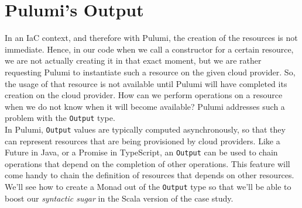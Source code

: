\section{Pulumi's Output}
In an IaC context, and therefore with Pulumi, the creation of the resources is not immediate.
Hence, in our code when we call a constructor for a certain resource, we are not actually creating it in that exact moment, but we are rather requesting Pulumi to instantiate such a resource on the given cloud provider.
So, the usage of that resource is not available until Pulumi will have completed its creation on the cloud provider.
How can we perform operations on a resource when we do not know when it will become available?
Pulumi addresses such a problem with the \texttt{Output} type.\\
In Pulumi, \texttt{Output} values are typically computed asynchronously, so that they can represent resources that are being provisioned by cloud providers.
Like a Future in Java, or a Promise in TypeScript, an \texttt{Output} can be used to chain operations that depend on the completion of other operations.
This feature will come handy to chain the definition of resources that depends on other resources.\\
We'll see how to create a Monad out of the \texttt{Output} type so that we'll be able to boost our \textit{syntactic sugar} in the Scala version of the case study.
